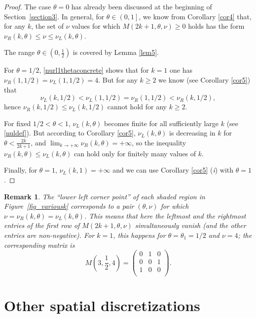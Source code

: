 \documentclass[smallextended,numbook,runningheads]{svjour3}     %
\newtheorem{remark}{Remark}
\newtheorem{remark}{Remark}
\newcommand{\te}{\theta}
\newcommand{\nul}{\nu_L(k,\theta)}
\newcommand{\nur}{\nu_R(k,\theta)}
\begin{document}
\begin{proof} The case $\te=0$ has already been discussed at the beginning of Section~\ref{section3}.
In general, for $\te\in\left(0,1\right]$, we know from Corollary \ref{cor4} that, for any $k$, the set of $\nu$ values for which $M(2k+1,\te,\nu)\ge 0$ holds has the form $\nur\le\nu\le\nul$. 

The range $\te\in\left(0,\frac{1}{2}\right)$ is covered by Lemma \ref{lem5}. 

For $\te=1/2$, \eqref{nurl1thetaconcrete} shows that for $k=1$ one has $\nu_R(1,1/2)=\nu_L(1,1/2)=4$. 
But for any $k\ge 2$ we know (see Corollary \ref{cor5}) that
\[
\nu_L(k,1/2)<\nu_L(1,1/2)=\nu_R(1,1/2)<\nu_R(k,1/2),
\]
hence $\nu_R(k,1/2)\le\nu_L(k,1/2)$ cannot hold for any $k\ge 2$.

For fixed $1/2<\te<1$, $\nul$ becomes finite for all sufficiently large $k$ (see \eqref{nuldef}). But according to Corollary \ref{cor5}, $\nul$ is decreasing in $k$ for $\te<\frac{2k}{2k+1}$, and 
$\lim_{k\to+\infty} \nur=+\infty$, so the inequality $\nur\le\nul$ can hold only for finitely many values of $k$.

Finally, for $\te=1$, $\nu_L(k,1)=+\infty$ and we can use Corollary \ref{cor5} (\textit{i}) with $\te=1$.
\end{proof}

\begin{remark}
The ``lower left corner point'' of each shaded region in Figure~\ref{fig_variousk} corresponds to a pair 
$(\te,\nu)$  for which $\nu=\nur=\nul$. This means that here the leftmost and the rightmost entries of the first row of $M(2k+1,\te,\nu)$ simultaneously vanish (and the other entries are non-negative). For $k=1$, this happens for $\te=\te_1=1/2$ and $\nu=4$; the corresponding matrix is
\begin{equation}\label{rem10thetahalfmatrix}
M\left(3,\frac{1}{2},4\right)=\left(
\begin{array}{ccc}
 0 & 1 & 0 \\
 0 & 0 & 1 \\
 1 & 0 & 0 \\
\end{array}
\right).
\end{equation}
\end{remark}


\section{Other spatial discretizations}\label{otherdisc}
\end{document}
